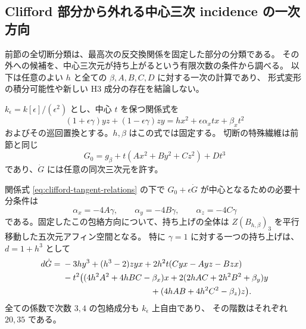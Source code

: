 \subsection{Clifford 部分から外れる中心三次 incidence の一次方向}
\label{subsec:clifford-transverse-tangent}
前節の全切断分類は、最高次の反交換関係を固定した部分の分類である。
その外への候補を、中心三次元が持ち上がるという有限次数の条件から調べる。
以下は任意のよい $h$ と全ての $\beta,A,B,C,D$ に対する一次の計算であり、
形式変形の積分可能性や新しい H3 成分の存在を結論しない。

$k_\epsilon=k[\epsilon]/(\epsilon^2)$ とし、中心 $t$ を保つ関係式を
\begin{equation}\label{eq:clifford-tangent-relations}
 (1+\epsilon\gamma)yz+(1-\epsilon\gamma)zy
 =hx^2+\epsilon\alpha_x tx+\beta_x t^2
\end{equation}
およびその巡回置換とする。$h,\beta$ はこの式では固定する。
切断の特殊繊維は前節と同じ
\[
 G_0=g_\beta+t(Ax^2+By^2+Cz^2)+Dt^3
\]
であり、$\dot G$ には任意の同次三次元を許す。

\begin{proposition}
\label{prop:clifford-transverse-tangent}
関係式 \eqref{eq:clifford-tangent-relations} の下で
$G_0+\epsilon\dot G$ が中心となるための必要十分条件は
\begin{equation}\label{eq:clifford-tangent-criterion}
 \alpha_x=-4A\gamma,\qquad
 \alpha_y=-4B\gamma,\qquad
 \alpha_z=-4C\gamma
\end{equation}
である。固定したこの包絡方向について、持ち上げの全体は
$Z(B_{h,\beta})_3$ を平行移動した五次元アフィン空間となる。
特に $\gamma=1$ に対する一つの持ち上げは、$d=1+h^3$ として
\begin{align*}
 d\dot G={}&-3hy^3+(h^3-2)zyx
       +2h^2t(Cyx-Ayz-Bzx)\\
 &-t^2\bigl((4h^2A^2+4hBC-\beta_x)x
        +2(2hAC+2h^2B^2+\beta_y)y\\
 &\hspace{37mm}+(4hAB+4h^2C^2-\beta_z)z\bigr).
\end{align*}
全ての係数で次数 $3,4$ の包絡成分も $k_\epsilon$ 上自由であり、
その階数はそれぞれ $20,35$ である。
\end{proposition}

